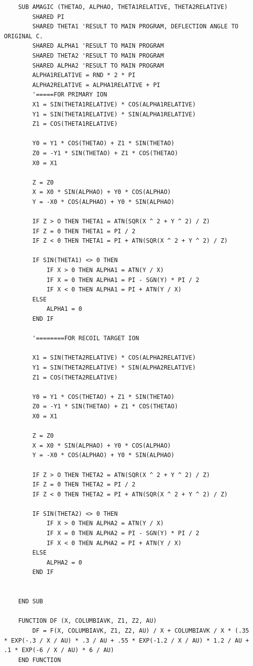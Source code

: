 \documentclass[10pt, reqno]{exam}
\begin{document}
\begin{verbatim}
    SUB AMAGIC (THETAO, ALPHAO, THETA1RELATIVE, THETA2RELATIVE)
        SHARED PI
        SHARED THETA1 'RESULT TO MAIN PROGRAM, DEFLECTION ANGLE TO ORIGINAL C.
        SHARED ALPHA1 'RESULT TO MAIN PROGRAM
        SHARED THETA2 'RESULT TO MAIN PROGRAM
        SHARED ALPHA2 'RESULT TO MAIN PROGRAM
        ALPHA1RELATIVE = RND * 2 * PI
        ALPHA2RELATIVE = ALPHA1RELATIVE + PI
        '=====FOR PRIMARY ION
        X1 = SIN(THETA1RELATIVE) * COS(ALPHA1RELATIVE)
        Y1 = SIN(THETA1RELATIVE) * SIN(ALPHA1RELATIVE)
        Z1 = COS(THETA1RELATIVE)
    
        Y0 = Y1 * COS(THETAO) + Z1 * SIN(THETAO)
        Z0 = -Y1 * SIN(THETAO) + Z1 * COS(THETAO)
        X0 = X1
    
        Z = Z0
        X = X0 * SIN(ALPHAO) + Y0 * COS(ALPHAO)
        Y = -X0 * COS(ALPHAO) + Y0 * SIN(ALPHAO)
    
        IF Z > O THEN THETA1 = ATN(SQR(X ^ 2 + Y ^ 2) / Z)
        IF Z = 0 THEN THETA1 = PI / 2
        IF Z < 0 THEN THETA1 = PI + ATN(SQR(X ^ 2 + Y ^ 2) / Z)
    
        IF SIN(THETA1) <> 0 THEN
            IF X > 0 THEN ALPHA1 = ATN(Y / X)
            IF X = 0 THEN ALPHA1 = PI - SGN(Y) * PI / 2
            IF X < 0 THEN ALPHA1 = PI + ATN(Y / X)
        ELSE
            ALPHA1 = 0
        END IF
    
        '========FOR RECOIL TARGET ION
    
        X1 = SIN(THETA2RELATIVE) * COS(ALPHA2RELATIVE)
        Y1 = SIN(THETA2RELATIVE) * SIN(ALPHA2RELATIVE)
        Z1 = COS(THETA2RELATIVE)
    
        Y0 = Y1 * COS(THETAO) + Z1 * SIN(THETAO)
        Z0 = -Y1 * SIN(THETAO) + Z1 * COS(THETAO)
        X0 = X1
    
        Z = Z0
        X = X0 * SIN(ALPHAO) + Y0 * COS(ALPHAO)
        Y = -X0 * COS(ALPHAO) + Y0 * SIN(ALPHAO)
    
        IF Z > O THEN THETA2 = ATN(SQR(X ^ 2 + Y ^ 2) / Z)
        IF Z = 0 THEN THETA2 = PI / 2
        IF Z < 0 THEN THETA2 = PI + ATN(SQR(X ^ 2 + Y ^ 2) / Z)
    
        IF SIN(THETA2) <> 0 THEN
            IF X > 0 THEN ALPHA2 = ATN(Y / X)
            IF X = 0 THEN ALPHA2 = PI - SGN(Y) * PI / 2
            IF X < 0 THEN ALPHA2 = PI + ATN(Y / X)
        ELSE
            ALPHA2 = 0
        END IF
    
    
    END SUB
    
    FUNCTION DF (X, COLUMBIAVK, Z1, Z2, AU)
        DF = F(X, COLUMBIAVK, Z1, Z2, AU) / X + COLUMBIAVK / X * (.35 * EXP(-.3 / X / AU) * .3 / AU + .55 * EXP(-1.2 / X / AU) * 1.2 / AU + .1 * EXP(-6 / X / AU) * 6 / AU)
    END FUNCTION
    

\end{verbatim}
\end{document}
